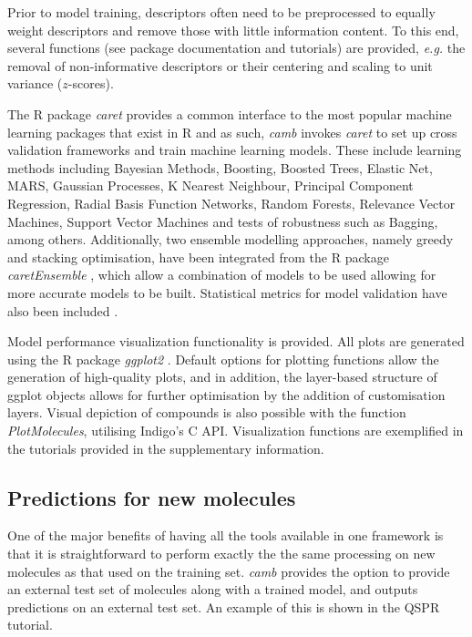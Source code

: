 \documentclass{bioinfo}
\begin{document}
Prior to model training, descriptors often need to be preprocessed \citep{andersson} to equally weight descriptors and remove those with little information content.
To this end, several functions (see package documentation and tutorials)
are provided, {\it e.g.} the removal of non-informative descriptors or
their centering and scaling to unit variance ($z$-scores).

The R package {\it caret} provides a common interface to the most popular machine learning packages that exist in R and as such, {\it camb} invokes {\it caret} to set up cross validation frameworks and
train machine learning models. 
These include learning methods including 
Bayesian Methods, Boosting, Boosted Trees, Elastic Net, MARS,
Gaussian Processes, K Nearest Neighbour, Principal Component
Regression, Radial Basis Function Networks, Random Forests,
Relevance Vector Machines, Support Vector Machines and tests of robustness such as Bagging, among
others.
Additionally, two ensemble modelling approaches, namely greedy and stacking optimisation,
have been integrated from the R package {\it caretEnsemble} \citep{caretEnsemble}, which allow a combination of models to be used 
allowing for more accurate models to be built.
Statistical metrics for model validation have also been included \citep{beware}.

Model performance visualization functionality is provided. All plots are generated using the R package {\it ggplot2} \citep{ggplot2}.
Default options for plotting functions allow the generation of high-quality plots,
and in addition, the layer-based structure of ggplot objects allows for further optimisation
by the addition of customisation layers.  
Visual depiction of compounds is also possible with the function {\it PlotMolecules},
utilising Indigo's C API. Visualization functions are exemplified in the tutorials provided in the supplementary information.

\subsection{Predictions for new molecules}
One of the major benefits of having all the tools available in one framework is that 
 it is straightforward to perform exactly the the same processing on new molecules as that used on the training set.
{\it camb} provides the option to provide an external test set of molecules along with a trained model, 
and outputs predictions on an external test set. An example of this is shown in the QSPR tutorial.
\end{document}
